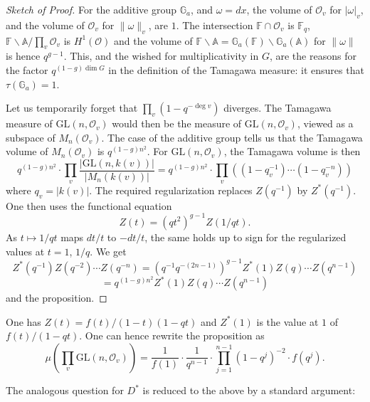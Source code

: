 \documentclass[11pt,a4paper]{article}
\theoremstyle{plain}
\theoremstyle{definition}
\newcommand{\Fq}{\mathbb{F}_q}
\newcommand{\Ga}{\mathbb{G}_a}
\newcommand{\GL}{\mathrm{GL}}
\begin{document}
\begin{proof}[Sketch of Proof]
For the additive group $\Ga$, and $\omega = dx$, the volume of $\mathcal{O}_v$ for $|\omega|_v$, and the volume of $\mathcal{O}_v$ for $\|\omega\|_v$, are $1$. The intersection $\mathbb{F} \cap \mathcal{O}_v$ is $\Fq$, $\mathbb{F} \backslash \mathbb{A} / \prod_v \mathcal{O}_v$ is $H^1(\mathcal{O})$ and the volume of $\mathbb{F} \backslash \mathbb{A} = \Ga(\mathbb{F}) \backslash \Ga(\mathbb{A})$ for $\|\omega\|$ is hence $q^{g-1}$. This, and the wished for multiplicativity in $G$, are the reasons for the factor $q^{(1-g)\dim G}$ in the definition of the Tamagawa measure: it ensures that $\tau(\Ga) = 1$.

Let us temporarily forget that $\prod_v (1 - q^{-\deg v})$ diverges. The Tamagawa measure of $\GL(n, \mathcal{O}_v)$ would then be the measure of $\GL(n, \mathcal{O}_v)$, viewed as a subspace of $M_n(\mathcal{O}_v)$. The case of the additive group tells us that the Tamagawa volume of $M_n(\mathcal{O}_v)$ is $q^{(1-g)n^2}$. For $\GL(n, \mathcal{O}_v)$, the Tamagawa volume is then
\[
q^{(1-g)n^2} \cdot \prod_v \frac{|\GL(n, k(v))|}{|M_n(k(v))|} = q^{(1-g)n^2} \cdot \prod_v ((1-q_v^{-1}) \cdots (1-q_v^{-n}))
\]
where $q_v = |k(v)|$. The required regularization replaces $Z(q^{-1})$ by $Z^*(q^{-1})$. One then uses the functional equation
\[
Z(t) = (qt^2)^{g-1} Z(1/qt).
\]
As $t \mapsto 1/qt$ maps $dt/t$ to $-dt/t$, the same holds up to sign for the regularized values at $t=1$, $1/q$. We get
\[
Z^*(q^{-1}) Z(q^{-2}) \cdots Z(q^{-n}) = (q^{-1} q^{-(2n-1)})^{g-1} Z^*(1) Z(q) \cdots Z(q^{n-1})
\]
\[
= q^{(1-g)n^2} Z^*(1) Z(q) \cdots Z(q^{n-1})
\]
and the proposition.
\end{proof}

One has $Z(t) = f(t)/(1-t)(1-qt)$ and $Z^*(1)$ is the value at $1$ of $f(t)/(1-qt)$. One can hence rewrite the proposition as
\begin{equation}
\mu\left(\prod_v \GL(n, \mathcal{O}_v)\right) = \frac{1}{f(1)} \cdot \frac{1}{q^{n-1}} \cdot \prod_{j=1}^{n-1} (1-q^j)^{-2} \cdot f(q^j). \tag{3.10.1}
\end{equation}

The analogous question for $D^*$ is reduced to the above by a standard argument:
\end{document}
